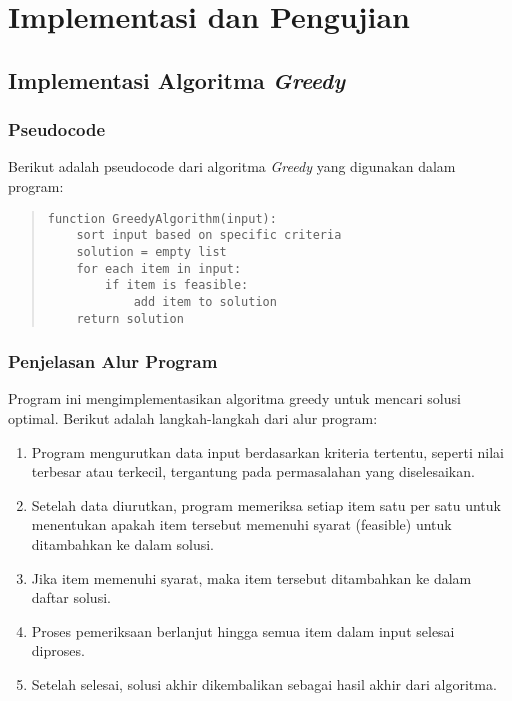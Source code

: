 \newpage
\chapter{Implementasi dan Pengujian} \label{Bab IV}

\section{Implementasi Algoritma \textit{Greedy}} \label{IV.Algoritma}

\subsection{Pseudocode}

Berikut adalah pseudocode dari algoritma \textit{Greedy} yang digunakan dalam program:

\begin{quote}
\begin{verbatim}
function GreedyAlgorithm(input):
    sort input based on specific criteria
    solution = empty list
    for each item in input:
        if item is feasible:
            add item to solution
    return solution
\end{verbatim}
\end{quote}

\subsection{Penjelasan Alur Program}\label{IV.Alur}

Program ini mengimplementasikan algoritma greedy untuk mencari solusi optimal. Berikut adalah langkah-langkah dari alur program:

\begin{enumerate}
    \item Program mengurutkan data input berdasarkan kriteria tertentu, seperti nilai terbesar atau terkecil, tergantung pada permasalahan yang diselesaikan.
    \item Setelah data diurutkan, program memeriksa setiap item satu per satu untuk menentukan apakah item tersebut memenuhi syarat (feasible) untuk ditambahkan ke dalam solusi.
    \item Jika item memenuhi syarat, maka item tersebut ditambahkan ke dalam daftar solusi.
    \item Proses pemeriksaan berlanjut hingga semua item dalam input selesai diproses.
    \item Setelah selesai, solusi akhir dikembalikan sebagai hasil akhir dari algoritma.
\end{enumerate}

